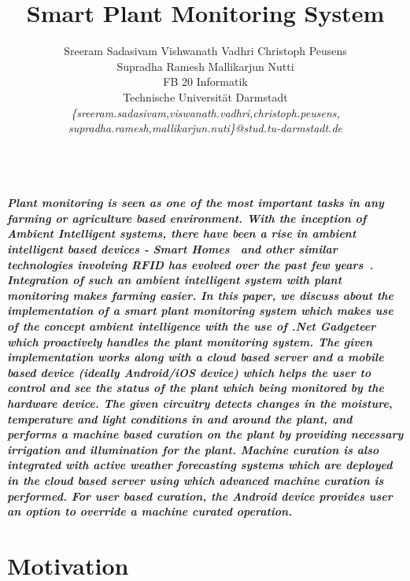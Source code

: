 \documentclass[10pt]{article}
\begin{document}
\title{\textbf{Smart Plant Monitoring System}}
\author{
\quad Sreeram Sadasivam \quad Vishwanath Vadhri \quad Christoph Peusens\\
\quad Supradha Ramesh \quad Mallikarjun Nutti\\
FB 20 Informatik\\
Technische Universität Darmstadt\\
\emph{\{sreeram.sadasivam,viswanath.vadhri,christoph.peusens,}\\
\emph{supradha.ramesh,mallikarjun.nuti\}@stud.tu-darmstadt.de}\\
\date{}
}
\maketitle
\textbf{\abstractname{
\emph {\textbf{\\
Plant monitoring is seen as one of the most important tasks in any farming or agriculture based environment. With the inception of Ambient Intelligent systems, there have been a rise in ambient intelligent based devices - Smart Homes~\cite{ref001} and other similar technologies involving RFID has evolved over the past few years~\cite{ref002}. Integration of such an ambient intelligent system with plant monitoring makes farming easier. In this paper, we discuss about the implementation of a smart plant monitoring system which makes use of the concept ambient intelligence with the use of .Net Gadgeteer which proactively handles the plant monitoring system. The given implementation works along with a cloud based server and a mobile based device (ideally Android/iOS device) which helps the user to control and see the status of the plant which being monitored by the hardware device. The given circuitry detects changes in the moisture, temperature and light conditions in and around the plant, and performs a machine based curation on the plant by providing necessary irrigation and illumination for the plant. Machine curation is also integrated with active weather forecasting systems which are deployed in the cloud based server using which advanced machine curation is performed. For user based curation, the Android device provides user an option to override a machine curated operation. %
}}}}

\section{Motivation}

\end{document}
